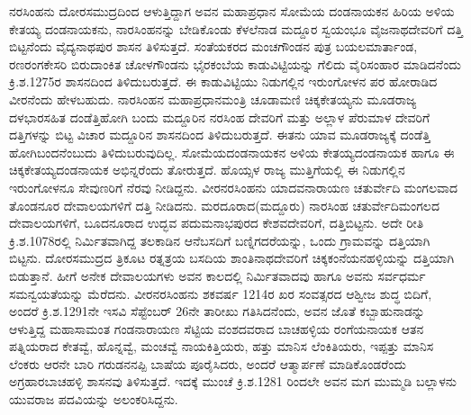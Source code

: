 ನರಸಿಂಹನು ದೋರಸಮುದ್ರದಿಂದ ಆಳುತ್ತಿದ್ದಾಗ ಅವನ ಮಹಾಪ್ರಧಾನ ಸೋಮೆಯ ದಂಡನಾಯಕನ ಹಿರಿಯ ಅಳಿಯ ಕೇತಯ್ಯ ದಂಡನಾಯಕನು, ನಾರಸಿಂಹನನ್ನು ಬೇಡಿಕೊಂಡು ಕೆಳಲೆನಾಡ ಮದ್ದೂರ ಸ್ವಯಂಭೂ ವೈಜನಾಥದೇವರಿಗೆ ದತ್ತಿ ಬಿಟ್ಟನೆಂದು ವೈದ್ಯನಾಥಪುರ ಶಾಸನ ತಿಳಿಸುತ್ತದೆ. ಸಂತೆಯಕರದ ಮಂಚಗೌಂಡನ ಪುತ್ರ ಬಯಲಮಾರ್ತಾಂಡ, ರಣರಂಗಕೇಸರಿ ಬಿರುದಾಂಕಿತ ಚೋಳಗೌಂಡನು ಭೈರಕಂಬೆಯ ಕಾಡುವಿಟ್ಟಿಯನ್ನು ಗೆಲಿದು ವೈರಿಸಂಹಾರ ಮಾಡಿದನೆಂದು ಕ್ರಿ.ಶ.1275ರ ಶಾಸನದಿಂದ ತಿಳಿದುಬರುತ್ತದೆ. ಈ ಕಾಡುವಿಟ್ಟಿಯು ನಿಡುಗಲ್ಲಿನ ಇರುಂಗೋಳನ ಪರ ಹೋರಾಡಿದ ವೀರನೆಂದು ಹೇಳಬಹುದು. ನಾರಸಿಂಹನ ಮಹಾಪ್ರಧಾನಮಂತ್ರಿ ಚೂಡಾಮಣಿ ಚಿಕ್ಕಕೇತಯ್ಯನು ಮೂಡರಾಜ್ಯ ದಳಭಾರಸಹಿತ ದಂಡೆತ್ತಿಹೋಗಿ ಬಂದು ಮದ್ದೂರಿನ ನರಸಿಂಹ ದೇವರಿಗೆ ಮತ್ತು ಅಲ್ಲಾಳ ಪೆರುಮಾಳ ದೇವರಿಗೆ ದತ್ತಿಗಳನ್ನು ಬಿಟ್ಟ ವಿಚಾರ ಮದ್ದೂರಿನ ಶಾಸನದಿಂದ ತಿಳಿದುಬರುತ್ತದೆ. ಈತನು ಯಾವ ಮೂಡರಾಜ್ಯಕ್ಕೆ ದಂಡೆತ್ತಿ ಹೋಗಿಬಂದನೆಂಬುದು ತಿಳಿದು\-ಬರುವುದಿಲ್ಲ. ಸೋಮೆಯದಂಡನಾಯಕನ ಅಳಿಯ ಕೇತಯ್ಯದಂಡನಾಯಕ ಹಾಗೂ ಈ ಚಿಕ್ಕಕೇತಯ್ಯದಂಡನಾಯಕ ಅಭಿನ್ನರೆಂದು ತೋರುತ್ತದೆ. ಹೊಯ್ಸಳ ರಾಜ್ಯ ಮುತ್ತಿಗೆಯಲ್ಲಿ ಈ ನಿಡುಗಲ್ಲಿನ ಇರುಂಗೋಳನೂ ಸೇವುಣರಿಗೆ ನೆರವು ನೀಡಿದ್ದನು. ವೀರನರಸಿಂಹನು ಯಾದವನಾರಾಯಣ ಚತುರ್ವೇದಿ ಮಂಗಲವಾದ ತೊಂಡನೂರ ದೇವಾಲಯಗಳಿಗೆ ದತ್ತಿ ನೀಡಿದನು. ಮರದೂರಾದ(ಮದ್ದೂರು) ನಾರಸಿಂಹ ಚತುರ್ವೇದಿಮಂಗಲದ ದೇವಾಲಯಗಳಿಗೆ, ಬೂದನೂರಾದ ಉದ್ಭವ ಪದುಮನಾಭಪುರದ ಕೇಶವದೇವರಿಗೆ, ದತ್ತಿಬಿಟ್ಟನು. ಅದೇ ರೀತಿ ಕ್ರಿ.ಶ.1078ರಲ್ಲಿ ನಿರ್ಮಿತವಾಗಿದ್ದ ತಲಕಾಡಿನ ಆನೆಬಸದಿಗೆ ಬಣ್ನಿಗದರೆಯನ್ನು, ಒಂದು ಗ್ರಾಮವನ್ನು ದತ್ತಿಯಾಗಿ ಬಿಟ್ಟನು. ದೋರಸಮುದ್ರದ ತ್ರಿಕೂಟ ರತ್ನತ್ರಯ ಬಸದಿಯ ಶಾಂತಿನಾಥದೇವರಿಗೆ ಚಿಕ್ಕಕಂನೆಯನಹಳ್ಳಿಯನ್ನು ದತ್ತಿಯಾಗಿ ಬಿಡುತ್ತಾನೆ. ಹೀಗೆ ಅನೇಕ ದೇವಾಲಯಗಳು ಅವನ ಕಾಲದಲ್ಲಿ ನಿರ್ಮಿತವಾದವು ಹಾಗೂ ಅವನು ಸರ್ವಧರ್ಮ ಸಮನ್ವಯತೆಯನ್ನು ಮೆರೆದನು. ವೀರನರಸಿಂಹನು ಶಕವರ್ಷ 1214ರ ಖರ ಸಂವತ್ಸರದ ಆಶ್ವೀಜ ಶುದ್ಧ ಬಿದಿಗೆ, ಅಂದರೆ ಕ್ರಿ.ಶ.1291ನೇ ಇಸವಿ ಸೆಪ್ಟೆಂಬರ್​ 26ನೇ ತಾರೀಖು ಗತಿಸಿದನೆಂದು, ಅವನ ಜೊತೆ ಕಬ್ಬಾಹುನಾಡನ್ನು ಆಳುತ್ತಿದ್ದ ಮಹಾಸಾಮಂತ ಗಂಡನಾರಾಯಣ ಸೆಟ್ಟಿಯ ವಂಶದವರಾದ ಬಾಚಹಳ್ಳಿಯ ರಂಗೆಯನಾಯಕ ಆತನ ಪತ್ನಿಯರಾದ ಕೇತವ್ವೆ, ಹೊನ್ನವ್ವೆ, ಮಂಚವ್ವೆ ನಾಯಕಿತ್ತಿಯರು, ಹತ್ತು ಮಾನಿಸ ಲೆಂಕಿತಿಯರು, ಇಪ್ಪತ್ತು ಮಾನಿಸ ಲೆಂಕರು ಆರನೇ ಬಾರಿ ಗರುಡನನಪ್ಪಿ ಬಾಷೆಯ ಪೂರೈಸಿದರು, ಅಂದರೆ ಆತ್ಮಾರ್ಪಣೆ ಮಾಡಿಕೊಂಡರೆಂದು ಅಗ್ರಹಾರಬಾಚಹಳ್ಳಿ ಶಾಸನವು ತಿಳಿಸುತ್ತದೆ. ಇದಕ್ಕೆ ಮುಂಚೆ ಕ್ರಿ.ಶ.1281 ರಿಂದಲೇ ಅವನ ಮಗ ಮುಮ್ಮಡಿ ಬಲ್ಲಾಳನು ಯುವರಾಜ ಪದವಿಯನ್ನು ಅಲಂಕರಿಸಿದ್ದನು.

